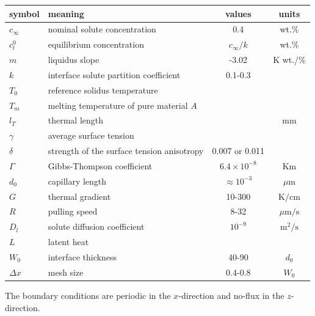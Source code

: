 \documentclass[a4paper,12pt]{article}
\begin{document}
\begin{table}
\centering
\begin{tabular}{l l c c }
\toprule
symbol & meaning & values & units \\
\midrule
$c_{\infty}$ & nominal solute concentration &  0.4 & wt.\%\\
$c_l^0$ & equilibrium concentration & $c_{\infty}/k$ & wt.\% \\
$m$ & liquidus slope & -3.02  &  K wt./\%\\
$k$ & interface solute partition coefficient & 0.1-0.3 &\\
$T_0$ & reference solidus temperature &  &\\
$T_m$ & melting temperature of pure material $A$ &  &\\
$l_T$ & thermal length &  & mm \\
$\gamma$ &  average surface tension &  & \\
$\delta$ & strength of the surface tension anisotropy  &  0.007 or 0.011 &\\
$\Gamma$ & Gibbs-Thompson coefficient & $6.4\times 10^{-8}$ & Km \\
$d_0$ & capillary length & $\approx 10^{-3}$  & $\mu$m \\
$G$ & thermal gradient & 10-300 & $\text{K} / \text{cm}$ \\
$R$ & pulling speed &  8-32 & $\mu \text{m} / \text{s}$ \\
$D_l$ & solute diffusion coefficient &$10^{-9}$ &  $\text{m}^2/\text{s}$ \\
$L$ & latent heat &  & \\
$W_0$ & interface thickness  & 40-90  & $d_0$ \\
$\Delta x$ & mesh size & 0.4-0.8 & $W_0$ \\
\bottomrule
\end{tabular}
\end{table}

The boundary conditions are periodic in the $x$-direction and no-flux in the $z$-direction.
\end{document}
